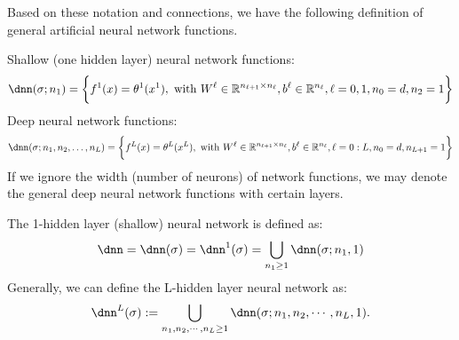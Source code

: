 Based on these notation and connections, we have the following definition of
general artificial neural network functions.

Shallow (one hidden layer) neural network functions:
\begin{equation}
\label{NN1}
\dnn(\sigma; n_1) 
=\bigg\{ f^1(x) = \theta^1 (x^1), \mbox{ with } W^\ell\in \mathbb R^{n_{\ell+1}\times
	n_{\ell}}, b^\ell\in\mathbb R^{n_\ell}, \ell=0, 1, n_0=d, n_2 = 1\bigg\}  
\end{equation}
Deep neural network functions:
\begin{align*}
\label{NNL}
\dnn(\sigma; n_1,n_2,\ldots, n_L)=\bigg\{ f^{L}(x) = \theta^L (x^{L}), 
 \mbox{ with } W^\ell\in \mathbb R^{n_{\ell+1}\times
	n_{\ell}}, b^\ell\in\mathbb R^{n_\ell}, \ell=0:L, n_0=d, n_{L+1}=1\bigg\}  
\end{align*}
If we ignore the width (number of neurons) of network functions, we may 
denote the general deep neural network functions with certain layers.

The 1-hidden layer (shallow) neural network is defined as:
\begin{equation}
\dnn=\dnn(\sigma) = \dnn^1(\sigma)
=\bigcup_{n_1\ge 1} \dnn(\sigma;n_1,1)
\end{equation}
Generally, we can define the L-hidden layer neural network as:
\begin{equation}
\dnn^L(\sigma) := \bigcup_{n_1, n_2, \cdots, n_{L}\ge 1} \dnn(\sigma;n_1,n_2,\cdots,n_L, 1).
\end{equation}







